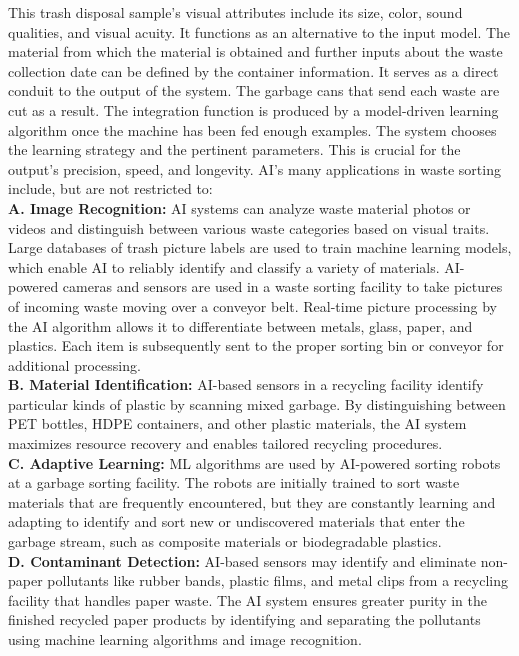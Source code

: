 \documentclass[a4paper,11pt,onecolumn]{article}
\begin{document}
This trash disposal sample's visual attributes include its size, color, sound qualities, and visual acuity. It functions as an alternative to the input model. The material from which the material is obtained and further inputs about the waste collection date can be defined by the container information. It serves as a direct conduit to the output of the system. The garbage cans that send each waste are cut as a result. The integration function is produced by a model-driven learning algorithm once the machine has been fed enough examples. The system chooses the learning strategy and the pertinent parameters. This is crucial for the output's precision, speed, and longevity. AI's many applications in waste sorting include, but are not restricted to:\\
\textbf{A. Image Recognition:} AI systems can analyze waste material photos or videos and distinguish between various waste categories based on visual traits. Large databases of trash picture labels are used to train machine learning models, which enable AI to reliably identify and classify a variety of materials. AI-powered cameras and sensors are used in a waste sorting facility to take pictures of incoming waste moving over a conveyor belt. Real-time picture processing by the AI algorithm allows it to differentiate between metals, glass, paper, and plastics. Each item is subsequently sent to the proper sorting bin or conveyor for additional processing.\\
\textbf{B. Material Identification:} AI-based sensors in a recycling facility identify particular kinds of plastic by scanning mixed garbage. By distinguishing between PET bottles, HDPE containers, and other plastic materials, the AI system maximizes resource recovery and enables tailored recycling procedures. \\
\textbf{C. Adaptive Learning:} ML algorithms are used by AI-powered sorting robots at a garbage sorting facility. The robots are initially trained to sort waste materials that are frequently encountered, but they are constantly learning and adapting to identify and sort new or undiscovered materials that enter the garbage stream, such as composite materials or biodegradable plastics. \\
\textbf{D. Contaminant Detection:} AI-based sensors may identify and eliminate non-paper pollutants like rubber bands, plastic films, and metal clips from a recycling facility that handles paper waste. The AI system ensures greater purity in the finished recycled paper products by identifying and separating the pollutants using machine learning algorithms and image recognition.\\
\end{document}
